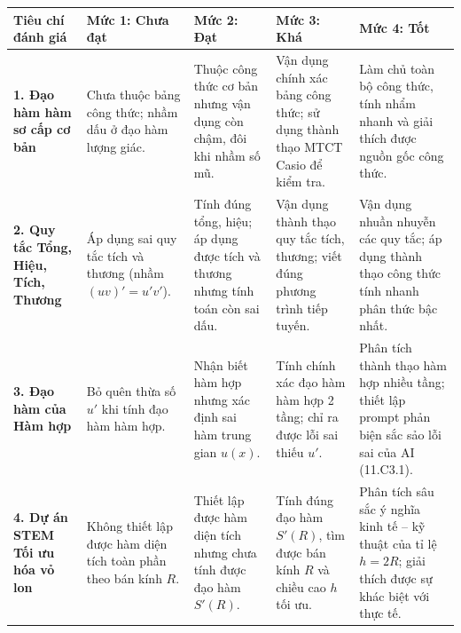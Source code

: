 \documentclass[12pt, a4paper]{article}
\begin{document}
\begin{center}
\small
\begin{tabularx}{\linewidth}{|p{3.2cm}|X|X|X|X|}
\hline
\textbf{Tiêu chí đánh giá} & \textbf{Mức 1: Chưa đạt} & \textbf{Mức 2: Đạt} & \textbf{Mức 3: Khá} & \textbf{Mức 4: Tốt} \\ \hline
\textbf{1. Đạo hàm hàm sơ cấp cơ bản} & Chưa thuộc bảng công thức; nhầm dấu ở đạo hàm lượng giác. & Thuộc công thức cơ bản nhưng vận dụng còn chậm, đôi khi nhầm số mũ. & Vận dụng chính xác bảng công thức; sử dụng thành thạo MTCT Casio để kiểm tra. & Làm chủ toàn bộ công thức, tính nhẩm nhanh và giải thích được nguồn gốc công thức. \\ \hline
\textbf{2. Quy tắc Tổng, Hiệu, Tích, Thương} & Áp dụng sai quy tắc tích và thương (nhầm $(uv)' = u'v'$). & Tính đúng tổng, hiệu; áp dụng được tích và thương nhưng tính toán còn sai dấu. & Vận dụng thành thạo quy tắc tích, thương; viết đúng phương trình tiếp tuyến. & Vận dụng nhuần nhuyễn các quy tắc; áp dụng thành thạo công thức tính nhanh phân thức bậc nhất. \\ \hline
\textbf{3. Đạo hàm của Hàm hợp} & Bỏ quên thừa số $u'$ khi tính đạo hàm hàm hợp. & Nhận biết hàm hợp nhưng xác định sai hàm trung gian $u(x)$. & Tính chính xác đạo hàm hàm hợp 2 tầng; chỉ ra được lỗi sai thiếu $u'$. & Phân tích thành thạo hàm hợp nhiều tầng; thiết lập prompt phản biện sắc sảo lỗi sai của AI (11.C3.1). \\ \hline
\textbf{4. Dự án STEM Tối ưu hóa vỏ lon} & Không thiết lập được hàm diện tích toàn phần theo bán kính $R$. & Thiết lập được hàm diện tích nhưng chưa tính được đạo hàm $S'(R)$. & Tính đúng đạo hàm $S'(R)$, tìm được bán kính $R$ và chiều cao $h$ tối ưu. & Phân tích sâu sắc ý nghĩa kinh tế -- kỹ thuật của tỉ lệ $h = 2R$; giải thích được sự khác biệt với thực tế. \\ \hline
\end{tabularx}
\end{center}
\end{document}
